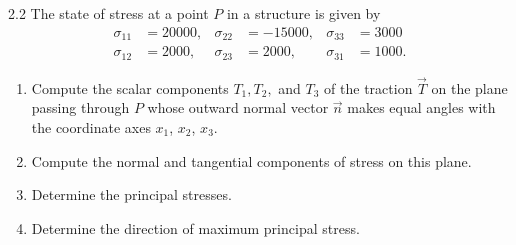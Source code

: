 
\begin{problem}{2.2}
  The state of stress at a point $P$ in a structure is given by
  \begin{align*}
    \sigma_{11} &= \num{20000}, & \sigma_{22} &= \num{-15000} , & \sigma_{33} &= \num{3000} \\
    \sigma_{12} &= \num{2000} , & \sigma_{23} &= \num{2000}, & \sigma_{31} &= \num{1000}
  .\end{align*}

  \begin{enumerate}[label=(\alph*)]
    \item Compute the scalar components $T_1, T_2, $ and $T_3$ of the traction $\Vec{T}$ on the plane passing through $P$ whose outward normal vector $\Vec{n}$ makes equal angles with the coordinate axes $x_1$, $x_2$, $x_3$.
    \item Compute the normal and tangential components of stress on this plane.
    \item[(d)] Determine the principal stresses.
    \item[(e)] Determine the direction of maximum principal stress.
  \end{enumerate}
\end{problem}

